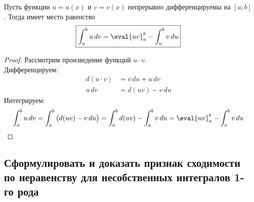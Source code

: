 \begin{theorem}
    Пусть функции $u = u(x)$ и $v = v(x)$ непрерывно дифференцируемы на $[a;b]$. Тогда имеет место равенство
    \[
        \boxed{\int_{a}^{b} u\, dv = \eval{uv}_{a}^{b} - \int_{a}^{b} v\, du}
    \]
\end{theorem}
\begin{proof}
    Рассмотрим произведение функций $u\cdot v$. \\
    Дифференцируем:
    \begin{align*}
        d(u\cdot v) &=  v\, du + u\, dv \\ 
        u\, dv &= d(u v) - v\, du
    \end{align*}
    Интегрируем:
    \begin{align*}
        \int_{a}^{b} u\, dv = \int_{a}^{b} \big(d(uv) - v\, du\big) = \int_{a}^{b} d(uv) - \int_{a}^{b} v\, du = \eval{uv}_{a}^{b} - \int_{a}^{b} v\, du
    \end{align*}
\end{proof}

\newpage
\subsection{Сформулировать и доказать признак сходимости по неравенству для несобственных интегралов 1-го рода}

